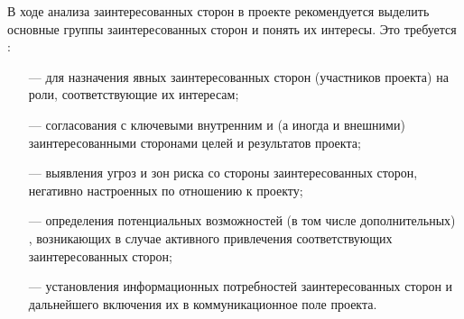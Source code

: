 В ходе анализа заинтересованных сторон в проекте рекомендуется выделить основные группы заинтересованных сторон и понять их ин­тересы.
Это требуется :
\begin{itemize}
	\item [---]для назначения явных заинтересованных сторон (участников про­екта) на роли, соответствующие их интересам;
	\item [---]согласования с ключевыми внутренним и (а иногда и внешними) заинтересованными сторонами целей и результатов проекта;
	\item [---]выявления угроз и зон риска со стороны заинтересованных сторон, негативно настроенных по отношению к проекту;
	\item [---]определения потенциальных возможностей (в том числе дополни­тельных) , возникающих в случае активного привлечения соответ­ствующих заинтересованных сторон;
	\item [---]установления информационных потребностей заинтересованных сторон и дальнейшего включения их в коммуникационное поле проекта.
\end{itemize}




